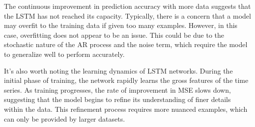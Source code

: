 The continuous improvement in prediction accuracy with more data suggests that the LSTM has not reached its capacity. Typically, there is a concern that a model may overfit to the training data if given too many examples.
However, in this case, overfitting does not appear to be an issue. This could be due to the stochastic nature of the AR process and the noise term, which require the model to generalize well to perform accurately.

It's also worth noting the learning dynamics of LSTM networks. During the initial phase of training, the network rapidly learns the gross features of the time series. As training progresses, the rate of improvement in MSE slows down, suggesting that the model begins to refine its understanding of finer details within the data. This refinement process requires more nuanced examples, which can only be provided by larger datasets.